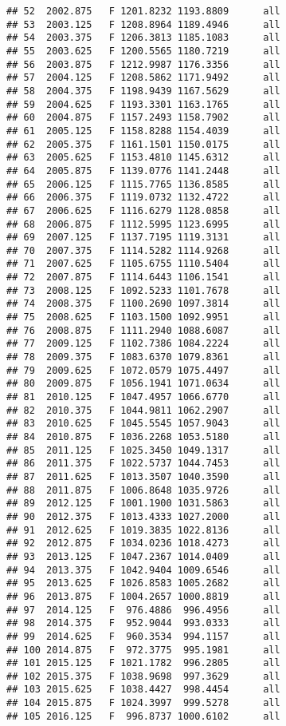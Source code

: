 \documentclass[]{article}
\begin{document}
\begin{verbatim}
## 52  2002.875   F 1201.8232 1193.8809      all
## 53  2003.125   F 1208.8964 1189.4946      all
## 54  2003.375   F 1206.3813 1185.1083      all
## 55  2003.625   F 1200.5565 1180.7219      all
## 56  2003.875   F 1212.9987 1176.3356      all
## 57  2004.125   F 1208.5862 1171.9492      all
## 58  2004.375   F 1198.9439 1167.5629      all
## 59  2004.625   F 1193.3301 1163.1765      all
## 60  2004.875   F 1157.2493 1158.7902      all
## 61  2005.125   F 1158.8288 1154.4039      all
## 62  2005.375   F 1161.1501 1150.0175      all
## 63  2005.625   F 1153.4810 1145.6312      all
## 64  2005.875   F 1139.0776 1141.2448      all
## 65  2006.125   F 1115.7765 1136.8585      all
## 66  2006.375   F 1119.0732 1132.4722      all
## 67  2006.625   F 1116.6279 1128.0858      all
## 68  2006.875   F 1112.5995 1123.6995      all
## 69  2007.125   F 1137.7195 1119.3131      all
## 70  2007.375   F 1114.5282 1114.9268      all
## 71  2007.625   F 1105.6755 1110.5404      all
## 72  2007.875   F 1114.6443 1106.1541      all
## 73  2008.125   F 1092.5233 1101.7678      all
## 74  2008.375   F 1100.2690 1097.3814      all
## 75  2008.625   F 1103.1500 1092.9951      all
## 76  2008.875   F 1111.2940 1088.6087      all
## 77  2009.125   F 1102.7386 1084.2224      all
## 78  2009.375   F 1083.6370 1079.8361      all
## 79  2009.625   F 1072.0579 1075.4497      all
## 80  2009.875   F 1056.1941 1071.0634      all
## 81  2010.125   F 1047.4957 1066.6770      all
## 82  2010.375   F 1044.9811 1062.2907      all
## 83  2010.625   F 1045.5545 1057.9043      all
## 84  2010.875   F 1036.2268 1053.5180      all
## 85  2011.125   F 1025.3450 1049.1317      all
## 86  2011.375   F 1022.5737 1044.7453      all
## 87  2011.625   F 1013.3507 1040.3590      all
## 88  2011.875   F 1006.8648 1035.9726      all
## 89  2012.125   F 1001.1900 1031.5863      all
## 90  2012.375   F 1013.4333 1027.2000      all
## 91  2012.625   F 1019.3835 1022.8136      all
## 92  2012.875   F 1034.0236 1018.4273      all
## 93  2013.125   F 1047.2367 1014.0409      all
## 94  2013.375   F 1042.9404 1009.6546      all
## 95  2013.625   F 1026.8583 1005.2682      all
## 96  2013.875   F 1004.2657 1000.8819      all
## 97  2014.125   F  976.4886  996.4956      all
## 98  2014.375   F  952.9044  993.0333      all
## 99  2014.625   F  960.3534  994.1157      all
## 100 2014.875   F  972.3775  995.1981      all
## 101 2015.125   F 1021.1782  996.2805      all
## 102 2015.375   F 1038.9698  997.3629      all
## 103 2015.625   F 1038.4427  998.4454      all
## 104 2015.875   F 1024.3997  999.5278      all
## 105 2016.125   F  996.8737 1000.6102      all

\end{verbatim}
\end{document}
